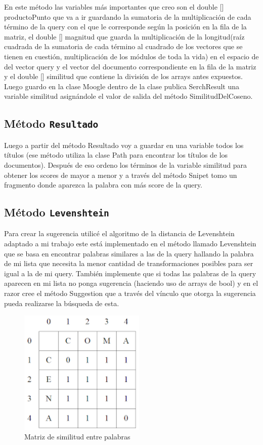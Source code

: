 \documentclass [a4paper,12pt]{article}
\begin{document}
En este método las variables más importantes que creo son el double [] productoPunto que va a ir guardando la sumatoria de la multiplicación de cada término de la query con el que le corresponde según la posición en la fila de la matriz, el double [] magnitud que guarda la multiplicación de la longitud(raíz cuadrada de la sumatoria de cada término al cuadrado de los vectores que se tienen en cuestión, multiplicación de los módulos de toda la vida) en el espacio de del vector query y el vector del documento correspondiente en la fila de la matriz y el double [] similitud que contiene la división de los arrays antes expuestos.
Luego guardo en la clase Moogle dentro de la clase publica SerchResult una variable similitud asignándole el valor de salida del método SimilitudDelCoseno.
\subsection{Método \texttt{Resultado}}\label{sub:center}
Luego a partir del método Resultado voy a guardar en una variable todos los títulos (ese método utiliza la clase Path para encontrar los títulos de los documentos). Después de eso ordeno los términos de la variable similitud para obtener los scores de mayor a menor y a través del método Snipet tomo un fragmento donde aparezca la palabra con más score de la query.
\subsection{Método \texttt{Levenshtein}}\label{sub:center}
Para crear la sugerencia utilicé el algoritmo de la distancia de Levenshtein adaptado a mi trabajo este está implementado en el método llamado Levenshtein que se basa en encontrar palabras similares a las de la query hallando la palabra de mi lista que necesita la menor cantidad de transformaciones posibles para ser igual a la de mi query. También implemente que si todas las palabras de la query aparecen en mi lista no ponga sugerencia (haciendo uso de arrays de bool) y en el razor cree el método Suggestion que a través del vínculo que otorga la sugerencia pueda realizarse la búsqueda de esta.
\begin{figure}[h]
	\center
	\includegraphics[width = 6cm]{Picture4.png}
	\caption{Matriz de similitud entre palabras}
	\label{fig:levenshtein}
\end{figure}
\newpage
\end{document}
